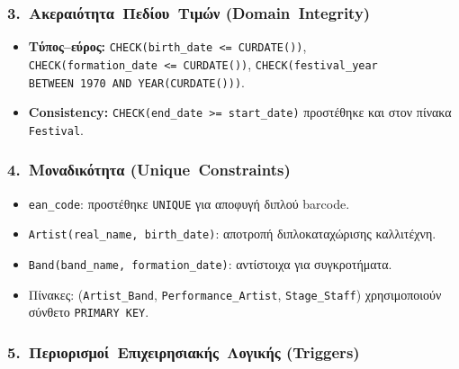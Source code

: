 \documentclass[a4paper,12pt]{article}
\begin{document}
\subsubsection*{3.~Ακεραιότητα Πεδίου Τιμών (Domain Integrity)}
\begin{itemize}
  \item \textbf{Τύπος–εύρος:}
        \texttt{CHECK(birth\_date~\textless=~CURDATE())},
        \texttt{CHECK(formation\_date~\textless=~CURDATE())},
        \texttt{CHECK(festival\_year BETWEEN~1970 AND~YEAR(CURDATE()))}.

  \item \textbf{Consistency:}
        \texttt{CHECK(end\_date~\textgreater=~start\_date)} προστέθηκε
        και στον πίνακα \texttt{Festival}.
\end{itemize}

\subsubsection*{4.~Μοναδικότητα (Unique Constraints)}
\begin{itemize}
  \item \texttt{ean\_code}: προστέθηκε \texttt{UNIQUE} για αποφυγή
        διπλού barcode.
  \item \texttt{Artist(real\_name,~birth\_date)}:
        αποτροπή διπλοκαταχώρισης καλλιτέχνη.
  \item \texttt{Band(band\_name,~formation\_date)}:
        αντίστοιχα για συγκροτήματα.
  \item Πίνακες:
        (\texttt{Artist\_Band}, \texttt{Performance\_Artist},
        \texttt{Stage\_Staff}) χρησιμοποιούν σύνθετο \texttt{PRIMARY~KEY}.
\end{itemize}

\subsubsection*{5.~Περιορισμοί Επιχειρησιακής Λογικής (Triggers)}
\end{document}

